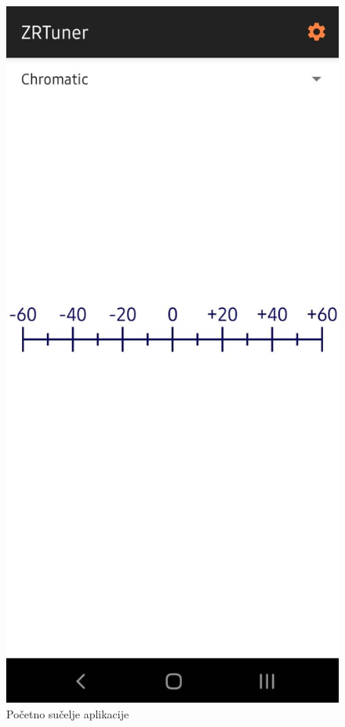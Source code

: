 \documentclass[times, utf8, zavrsni, numeric]{fer}
\begin{document}
\begin{figure}
	\centerline{\includegraphics[height=0.9\textheight]{zrtuner_gauge.jpeg}}
	\caption{Početno sučelje aplikacije}
	\label{fig}
\end{figure}
\end{document}
